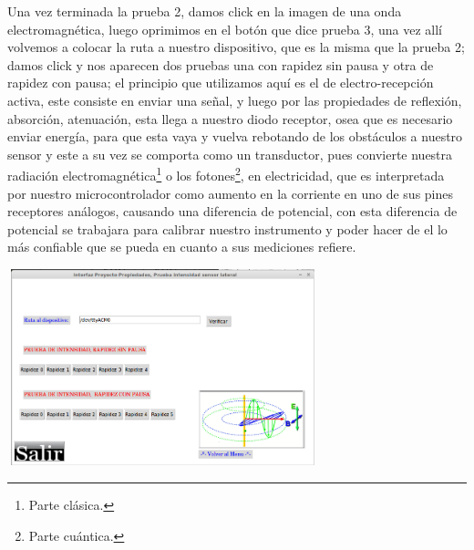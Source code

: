 \documentclass[12]{article}
\newenvironment{Figure}
{\par\medskip\noindent\minipage{\linewidth}}
{\endminipage\par\medskip}
\begin{document}
\begin{multicols}{2}
Una vez terminada la prueba 2, damos click en la imagen de una onda electromagnética, luego oprimimos en el botón que dice prueba 3, una vez allí volvemos a colocar la ruta a nuestro dispositivo, que es la misma que la prueba 2; damos click y nos aparecen dos pruebas una con rapidez sin pausa y otra de rapidez con pausa; el principio que utilizamos aquí es el de electro-recepción activa\cite{CIRCUITOS}, este consiste en enviar una señal, y luego por las propiedades\cite{BERKELEY} de reflexión\cite{HECHT}, absorción\cite{HECHT}, atenuación\cite{HECHT}, esta llega a nuestro diodo receptor\cite{INFRARED}, osea que es necesario enviar energía, para que esta vaya y vuelva rebotando de los obstáculos a nuestro sensor y este a su vez se comporta como un  transductor\cite{CIRCUITOS}, pues convierte nuestra radiación electromagnética\footnote{Parte clásica.} o los fotones\footnote{Parte cuántica.}, en electricidad, que es interpretada  por nuestro microcontrolador como aumento en la corriente en uno de sus pines receptores análogos,  causando una diferencia de potencial\cite{CIRCUITOS}, con esta diferencia de potencial se trabajara para calibrar nuestro instrumento y poder hacer de el lo más confiable que se pueda en cuanto a sus mediciones refiere.

\begin{Figure}	
\center
\includegraphics[width=9cm, height=5.7cm]{img/prueba2.png} 
\label{fig:g11}
\end{Figure}
\vspace{0.4 cm}


\end{multicols}
\end{document}
